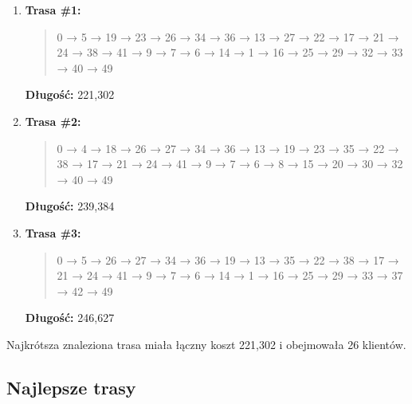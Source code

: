 \documentclass{article}
\begin{document}
\begin{enumerate}
    \item \textbf{Trasa \#1:}
    \begin{quote}
        0 → 5 → 19 → 23 → 26 → 34 → 36 → 13 → 27 → 22 → 17 → 21 → 24 → 38 → 41 → 9 → 7 → 6 → 14 → 1 → 16 → 25 → 29 → 32 → 33 → 40 → 49
    \end{quote}
    \textbf{Długość:} 221{,}302

    \item \textbf{Trasa \#2:}
    \begin{quote}
        0 → 4 → 18 → 26 → 27 → 34 → 36 → 13 → 19 → 23 → 35 → 22 → 38 → 17 → 21 → 24 → 41 → 9 → 7 → 6 → 8 → 15 → 20 → 30 → 32 → 40 → 49
    \end{quote}
    \textbf{Długość:} 239{,}384

    \item \textbf{Trasa \#3:}
    \begin{quote}
        0 → 5 → 26 → 27 → 34 → 36 → 19 → 13 → 35 → 22 → 38 → 17 → 21 → 24 → 41 → 9 → 7 → 6 → 14 → 1 → 16 → 25 → 29 → 33 → 37 → 42 → 49
    \end{quote}
    \textbf{Długość:} 246{,}627
\end{enumerate}

Najkrótsza znaleziona trasa miała łączny koszt 221{,}302 i obejmowała 26 klientów.

\subsection*{Najlepsze trasy}
\end{document}
